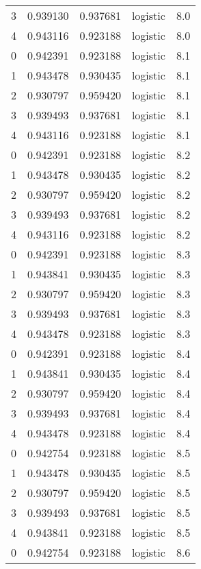 \begin{tabular}{rrrlr}
     3 & 0.939130 & 0.937681 & logistic &        8.0 \\
     4 & 0.943116 & 0.923188 & logistic &        8.0 \\
     0 & 0.942391 & 0.923188 & logistic &        8.1 \\
     1 & 0.943478 & 0.930435 & logistic &        8.1 \\
     2 & 0.930797 & 0.959420 & logistic &        8.1 \\
     3 & 0.939493 & 0.937681 & logistic &        8.1 \\
     4 & 0.943116 & 0.923188 & logistic &        8.1 \\
     0 & 0.942391 & 0.923188 & logistic &        8.2 \\
     1 & 0.943478 & 0.930435 & logistic &        8.2 \\
     2 & 0.930797 & 0.959420 & logistic &        8.2 \\
     3 & 0.939493 & 0.937681 & logistic &        8.2 \\
     4 & 0.943116 & 0.923188 & logistic &        8.2 \\
     0 & 0.942391 & 0.923188 & logistic &        8.3 \\
     1 & 0.943841 & 0.930435 & logistic &        8.3 \\
     2 & 0.930797 & 0.959420 & logistic &        8.3 \\
     3 & 0.939493 & 0.937681 & logistic &        8.3 \\
     4 & 0.943478 & 0.923188 & logistic &        8.3 \\
     0 & 0.942391 & 0.923188 & logistic &        8.4 \\
     1 & 0.943841 & 0.930435 & logistic &        8.4 \\
     2 & 0.930797 & 0.959420 & logistic &        8.4 \\
     3 & 0.939493 & 0.937681 & logistic &        8.4 \\
     4 & 0.943478 & 0.923188 & logistic &        8.4 \\
     0 & 0.942754 & 0.923188 & logistic &        8.5 \\
     1 & 0.943478 & 0.930435 & logistic &        8.5 \\
     2 & 0.930797 & 0.959420 & logistic &        8.5 \\
     3 & 0.939493 & 0.937681 & logistic &        8.5 \\
     4 & 0.943841 & 0.923188 & logistic &        8.5 \\
     0 & 0.942754 & 0.923188 & logistic &        8.6 \\

\end{tabular}
